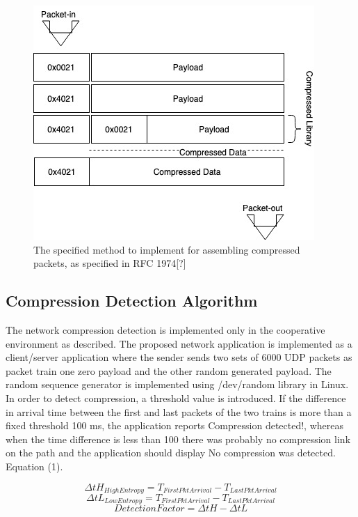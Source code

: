 \documentclass[sigconf]{acmart}
\begin{document}
\begin{figure}[h]
  \centering
  \includegraphics[width=\linewidth]{compression}
  \caption{The specified method to implement for assembling compressed packets, as specified in RFC 1974[?] }
\end{figure}


\subsection{Compression Detection Algorithm}
The network compression detection is implemented only in the cooperative environment as described. The proposed network application is implemented as a client/server application where the sender sends two sets of 6000 UDP packets as packet train one zero payload and the other random generated payload. The random sequence generator is implemented using /dev/random library in Linux. In order to detect compression, a threshold value is introduced. If the difference in arrival time between the first and last packets of the two trains is more than a fixed threshold 100 ms, the application reports Compression detected!, whereas when the time difference is less than 100 there was probably no compression link on the path and the application should display No compression was detected. Equation (1). 


\begin{displaymath}
	\Delta tH_{HighEntropy}  = T_{FirstPktArrival} - T_{LastPktArrival} 
\end{displaymath}
\begin{displaymath}
	\Delta tL_{LowEntropy}  = T_{FirstPktArrival} - T_{LastPktArrival} 
\end{displaymath}
\begin{equation}
 	DetectionFactor = \Delta tH - \Delta tL
\end{equation}
\end{document}
